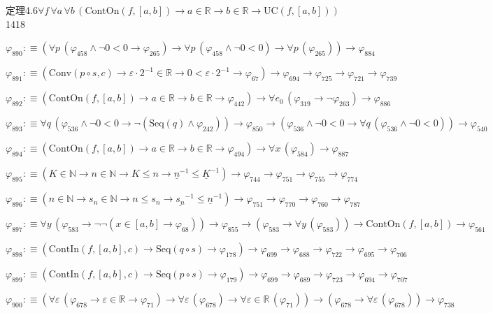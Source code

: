 \begin{fullproof}{定理4.6}{$\forall f\,\forall a\,\forall b\,(\mathrm{ContOn}(f,[a,b]) \to a \in \mathbb{R} \to b \in \mathbb{R} \to \mathrm{UC}(f,[a,b]))$}{1418}
\begin{abbrevlist}
\item $\varphi_{890} :\equiv (\forall p\,(\varphi_{458} \land \neg 0 < 0 \to \varphi_{265}) \to \forall p\,(\varphi_{458} \land \neg 0 < 0) \to \forall p\,(\varphi_{265})) \to \varphi_{884}$
\item $\varphi_{891} :\equiv (\mathrm{Conv}(p \circ s,c) \to \varepsilon \cdot 2^{-1} \in \mathbb{R} \to 0 < \varepsilon \cdot 2^{-1} \to \varphi_{67}) \to \varphi_{694} \to \varphi_{725} \to \varphi_{721} \to \varphi_{739}$
\item $\varphi_{892} :\equiv (\mathrm{ContOn}(f,[a,b]) \to a \in \mathbb{R} \to b \in \mathbb{R} \to \varphi_{442}) \to \forall e_{0}\,(\varphi_{319} \to \neg \varphi_{263}) \to \varphi_{886}$
\item $\varphi_{893} :\equiv \forall q\,(\varphi_{536} \land \neg 0 < 0 \to \neg (\mathrm{Seq}(q) \land \varphi_{242})) \to \varphi_{850} \to (\varphi_{536} \land \neg 0 < 0 \to \forall q\,(\varphi_{536} \land \neg 0 < 0)) \to \varphi_{540}$
\item $\varphi_{894} :\equiv (\mathrm{ContOn}(f,[a,b]) \to a \in \mathbb{R} \to b \in \mathbb{R} \to \varphi_{494}) \to \forall x\,(\varphi_{584}) \to \varphi_{887}$
\item $\varphi_{895} :\equiv (K \in \mathbb{N} \to n \in \mathbb{N} \to K \leq n \to \underline{n}^{-1} \leq \underline{K}^{-1}) \to \varphi_{744} \to \varphi_{751} \to \varphi_{755} \to \varphi_{774}$
\item $\varphi_{896} :\equiv (n \in \mathbb{N} \to s_{n} \in \mathbb{N} \to n \leq s_{n} \to \underline{s_{n}}^{-1} \leq \underline{n}^{-1}) \to \varphi_{751} \to \varphi_{770} \to \varphi_{760} \to \varphi_{787}$
\item $\varphi_{897} :\equiv \forall y\,(\varphi_{583} \to \neg \neg (x \in [a,b] \to \varphi_{68})) \to \varphi_{855} \to (\varphi_{583} \to \forall y\,(\varphi_{583})) \to \mathrm{ContOn}(f,[a,b]) \to \varphi_{561}$
\item $\varphi_{898} :\equiv (\mathrm{ContIn}(f,[a,b],c) \to \mathrm{Seq}(q \circ s) \to \varphi_{178}) \to \varphi_{699} \to \varphi_{688} \to \varphi_{722} \to \varphi_{695} \to \varphi_{706}$
\item $\varphi_{899} :\equiv (\mathrm{ContIn}(f,[a,b],c) \to \mathrm{Seq}(p \circ s) \to \varphi_{179}) \to \varphi_{699} \to \varphi_{689} \to \varphi_{723} \to \varphi_{694} \to \varphi_{707}$
\item $\varphi_{900} :\equiv (\forall \varepsilon\,(\varphi_{678} \to \varepsilon \in \mathbb{R} \to \varphi_{71}) \to \forall \varepsilon\,(\varphi_{678}) \to \forall \varepsilon \in \mathbb{R}\,(\varphi_{71})) \to (\varphi_{678} \to \forall \varepsilon\,(\varphi_{678})) \to \varphi_{738}$

\end{abbrevlist}
\end{fullproof}
